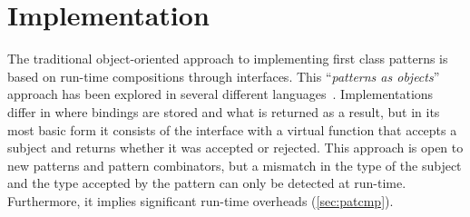\section{Implementation} %
\label{sec:impl}

The traditional object-oriented approach to implementing 
first class patterns is based on run-time compositions through 
interfaces. This ``\emph{patterns as objects}'' approach has been 
explored in several different languages~\cite{Visser06matchingobjects,geller2010pattern,FuncCSharp,Grace2012}.
Implementations differ in where bindings are stored and what is returned as a 
result, but in its most basic form it consists of the 
 interface with a virtual function  that accepts a subject 
and returns whether it was accepted or rejected.
This approach is open to new patterns and pattern combinators, but a mismatch in the type of the subject and the 
type accepted by the pattern can only be detected at run-time.
Furthermore, it implies significant run-time overheads (\textsection\ref{sec:patcmp}).


